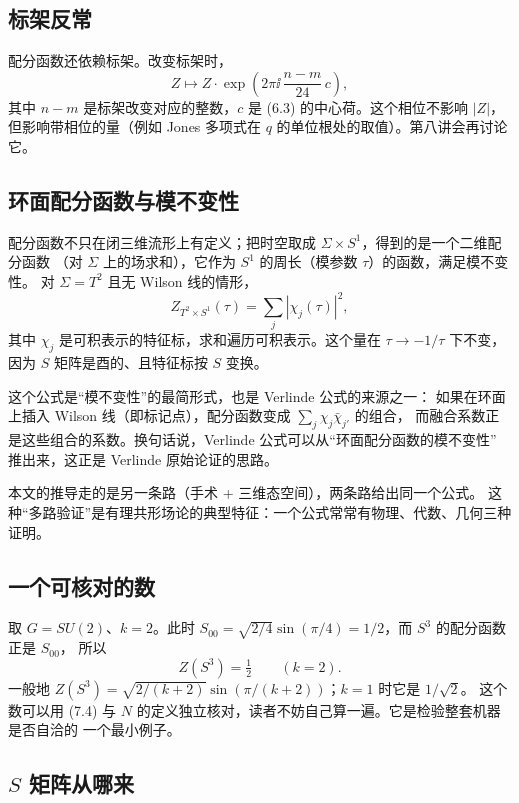 \subsection{标架反常}

配分函数还依赖标架。改变标架时，
\begin{equation}
Z\longmapsto Z\cdot\exp\left(2\pi\ii\,\frac{n-m}{24}\,c\right), \tag{7.6}
\end{equation}
其中 $n-m$ 是标架改变对应的整数，$c$ 是 (6.3) 的中心荷。这个相位不影响 $|Z|$，
但影响带相位的量（例如 Jones 多项式在 $q$ 的单位根处的取值）。第八讲会再讨论它。

\subsection{环面配分函数与模不变性}

配分函数不只在闭三维流形上有定义；把时空取成 $\Sigma\times S^1$，得到的是一个二维配分函数
（对 $\Sigma$ 上的场求和），它作为 $S^1$ 的周长（模参数 $\tau$）的函数，满足模不变性。
对 $\Sigma=T^2$ 且无 Wilson 线的情形，
\[
Z_{T^2\times S^1}(\tau)=\sum_{j} |\chi_j(\tau)|^2 ,
\]
其中 $\chi_j$ 是可积表示的特征标，求和遍历可积表示。这个量在 $\tau\to-1/\tau$ 下不变，
因为 $S$ 矩阵是酉的、且特征标按 $S$ 变换。

这个公式是“模不变性”的最简形式，也是 Verlinde 公式的来源之一：
如果在环面上插入 Wilson 线（即标记点），配分函数变成 $\sum_j \chi_j\bar\chi_{j'}$ 的组合，
而融合系数正是这些组合的系数。换句话说，Verlinde 公式可以从“环面配分函数的模不变性”
推出来，这正是 Verlinde 原始论证的思路。

本文的推导走的是另一条路（手术 + 三维态空间），两条路给出同一个公式。
这种“多路验证”是有理共形场论的典型特征：一个公式常常有物理、代数、几何三种证明。

\subsection{一个可核对的数}

取 $G=SU(2)$、$k=2$。此时 $S_{00}=\sqrt{2/4}\sin(\pi/4)=1/2$，而 $S^3$ 的配分函数正是 $S_{00}$，
所以
\[
Z(S^3)=\tfrac12\qquad(k=2).
\]
一般地 $Z(S^3)=\sqrt{2/(k+2)}\sin(\pi/(k+2))$；$k=1$ 时它是 $1/\sqrt2$。
这个数可以用 (7.4) 与 $N$ 的定义独立核对，读者不妨自己算一遍。它是检验整套机器是否自洽的
一个最小例子。

\subsection{$S$ 矩阵从哪来}

